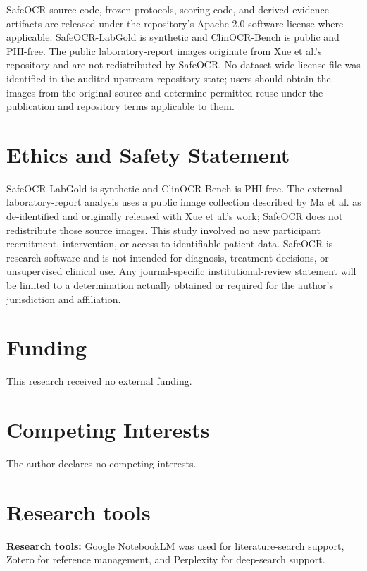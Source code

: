 \documentclass[10pt]{article}
\begin{document}
SafeOCR source code, frozen protocols, scoring code, and derived evidence artifacts are released under the repository's Apache-2.0 software license where applicable. SafeOCR-LabGold is synthetic and ClinOCR-Bench is public and PHI-free. The public laboratory-report images originate from Xue et al.'s repository and are not redistributed by SafeOCR. No dataset-wide license file was identified in the audited upstream repository state; users should obtain the images from the original source and determine permitted reuse under the publication and repository terms applicable to them.

\section*{Ethics and Safety Statement}

SafeOCR-LabGold is synthetic and ClinOCR-Bench is PHI-free. The external laboratory-report analysis uses a public image collection described by Ma et al. as de-identified and originally released with Xue et al.'s work; SafeOCR does not redistribute those source images. This study involved no new participant recruitment, intervention, or access to identifiable patient data. SafeOCR is research software and is not intended for diagnosis, treatment decisions, or unsupervised clinical use. Any journal-specific institutional-review statement will be limited to a determination actually obtained or required for the author's jurisdiction and affiliation.

\section*{Funding}

This research received no external funding.

\section*{Competing Interests}

The author declares no competing interests.

\section*{Research tools}

\textbf{Research tools:} Google NotebookLM was used for literature-search support, Zotero for reference management, and Perplexity for deep-search support.



\end{document}
